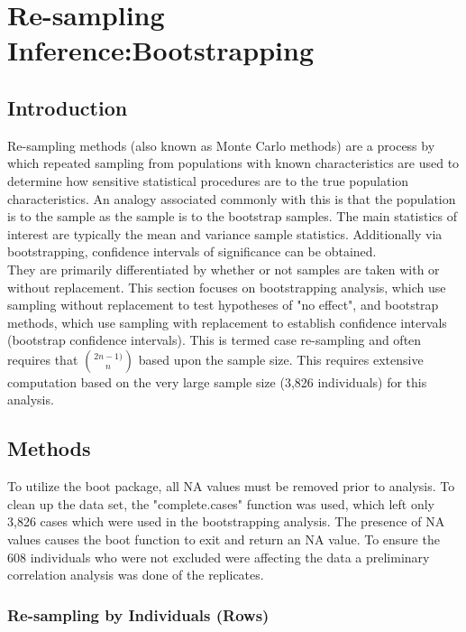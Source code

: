 \documentclass{article}\usepackage[]{graphicx}\usepackage[]{color}
\begin{document}
\section{Re-sampling Inference:Bootstrapping}
\subsection{Introduction}


Re-sampling methods (also known as Monte Carlo methods) are a process by which repeated sampling from populations with known characteristics are used to determine how sensitive statistical procedures are to the true population characteristics. An analogy associated commonly with this is that the population is to the sample as the sample is to the bootstrap samples.  The main statistics of interest are typically the mean and variance sample statistics.  Additionally via bootstrapping, confidence intervals of significance can be obtained. \\ 

They are primarily differentiated by whether or not samples are taken with or without replacement.  This section focuses on bootstrapping analysis, which use sampling without replacement to test hypotheses of "no effect", and bootstrap methods, which use sampling with replacement to establish confidence intervals (bootstrap confidence intervals). This is termed case re-sampling and often requires that ${{2n-1) \choose n}}$ based upon the sample size.  This requires extensive computation based on the very large sample size (3,826 individuals) for this analysis.







\subsection{Methods}

To utilize the boot package, all NA values must be removed prior to analysis.  To clean up the data set, the "complete.cases" function was used, which left only 3,826 cases which were used in the bootstrapping analysis.  The presence of NA values causes the boot function to exit and return an NA value.  To ensure the 608 individuals who were not excluded were affecting the data a preliminary correlation analysis was done of the replicates.


\subsubsection*{Re-sampling by Individuals (Rows)}
\end{document}

